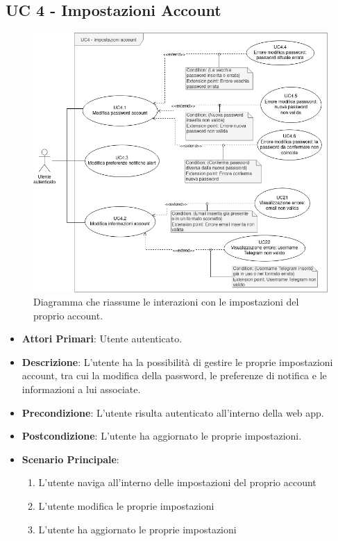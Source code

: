 	\subsection{UC 4 - Impostazioni Account}
		
		\begin{figure}[H]
			\centering
			\includegraphics[scale=0.60]{res/images/uc4}
			\caption{Diagramma che riassume le interazioni con le impostazioni del proprio account.}
		\end{figure}
		
		\begin{itemize}
			\item \textbf{Attori Primari}: Utente autenticato.
			\item \textbf{Descrizione}: L'utente ha la possibilità di gestire le proprie impostazioni account, tra cui la modifica della password, le preferenze di notifica e le informazioni a lui associate.
			\item \textbf{Precondizione}: L'utente risulta autenticato all'interno della web app.
			\item \textbf{Postcondizione}: L'utente ha aggiornato le proprie impostazioni.
			\item \textbf{Scenario Principale}:
			\begin{enumerate}
				\item{L'utente naviga all'interno delle impostazioni del proprio account}
				\item{L'utente modifica le proprie impostazioni}
				\item{L'utente ha aggiornato le proprie impostazioni}
			\end{enumerate}	
		\end{itemize}
			

